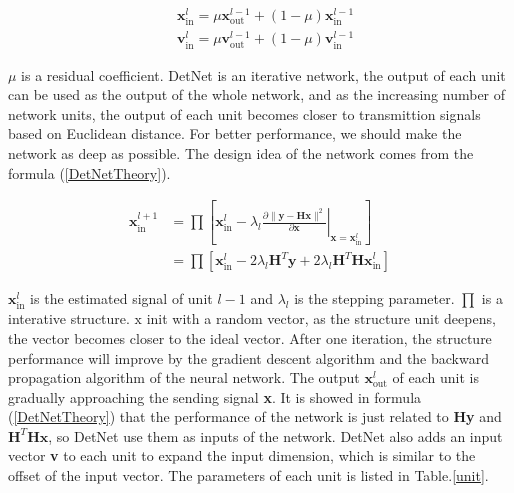 \documentclass[conference]{IEEEtran}
\begin{document}
\begin{equation}
\label{ResNet}
\begin{split}
&{\textbf{x}_{\textrm{in}}^l}=\mu{\textbf{x}_{\textrm{out}}^{l-1}}+(1-\mu)\textbf{x}_{\textrm{in}}^{l-1}\\
&{\textbf{v}_{\textrm{in}}^l}=\mu{\textbf{v}_{\textrm{out}}^{l-1}}+(1-\mu)\textbf{v}_{\textrm{in}}^{l-1}
\end{split}
\end{equation}

$\mu$ is a residual coefficient. DetNet is an iterative network, the output of each unit can be used as the output of the whole network, and as the increasing number of network units, the output of each unit becomes closer to transmittion signals based on Euclidean distance. For better performance, we should make the network as deep as possible. The design idea of the network comes from the formula (\ref{DetNetTheory}).

\begin{equation}
\label{DetNetTheory}
\begin{split}
\textbf{x}_{\textrm{in}}^{l+1} &=\prod\left[\textbf{x}_{\textrm{in}}^{l}-\lambda_l\left.\frac{\partial\|\textbf{y}-\textbf{Hx}\|^2}{\partial\textbf{x}}\right|_{\textbf{x}=\textbf{x}_{\textrm{in}}^l}\right]\\
&=\prod\left[\textbf{x}_{\textrm{in}}^l-2\lambda_l\textbf{H}^T\textbf{y}+2\lambda_l\textbf{H}^T\textbf{Hx}^l_{\textrm{in}}\right]
\end{split}
\end{equation}

${\textbf{x}_{\textrm{in}}^l}$ is the estimated signal of unit ${l-1}$ and $\lambda_l$ is the stepping parameter. ${\prod}$ is a interative structure. ${\textrm{x}}$ init with a random vector, as the structure unit deepens, the vector becomes closer to the ideal vector. After one iteration, the structure performance will improve by the gradient descent algorithm and the backward propagation algorithm of the neural network. The output ${\textbf{x}_{\textrm{out}}^l}$ of each unit is gradually approaching the sending signal \textbf{x}. It is showed in formula (\ref{DetNetTheory}) that the performance of the network is just related to \textbf{Hy} and ${\textbf{H}^T\textbf{Hx}}$, so DetNet use them as inputs of the network. DetNet also adds an input vector \textbf{v} to each unit to expand the input dimension, which is similar to the offset of the input vector. The parameters of each unit is listed in Table.\ref{unit}.
\end{document}
